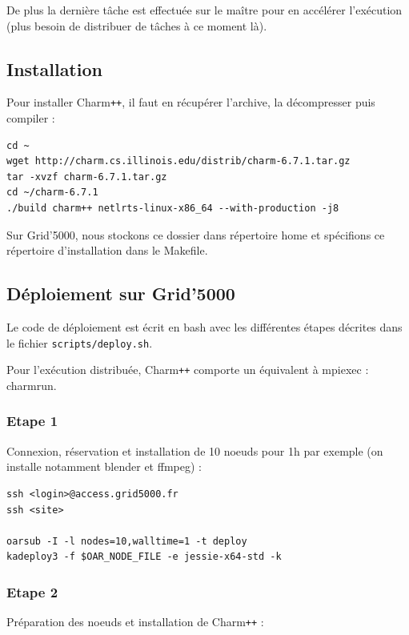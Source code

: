 \documentclass[a4paper, 11pt, titlepage]{article}
\begin{document}
De plus la dernière tâche est effectuée sur le maître pour en accélérer l'exécution (plus besoin de distribuer de tâches à ce moment là).


\subsection {Installation}

\noindent Pour installer Charm\texttt{++}, il faut en récupérer l'archive, la décompresser puis compiler :

\begin{verbatim}
cd ~
wget http://charm.cs.illinois.edu/distrib/charm-6.7.1.tar.gz
tar -xvzf charm-6.7.1.tar.gz
cd ~/charm-6.7.1
./build charm++ netlrts-linux-x86_64 --with-production -j8
\end{verbatim}

Sur Grid'5000, nous stockons ce dossier dans répertoire home et spécifions ce répertoire d'installation dans le Makefile.


\subsection {Déploiement sur Grid'5000}

Le code de déploiement est écrit en bash avec les différentes étapes décrites dans le fichier \texttt{scripts/deploy.sh}.

Pour l'exécution distribuée, Charm\texttt{++} comporte un équivalent à mpiexec : charmrun.


\subsubsection {Etape 1}

Connexion, réservation et installation de 10 noeuds pour 1h par exemple (on installe notamment blender et ffmpeg) :

\begin{verbatim}
ssh <login>@access.grid5000.fr
ssh <site>

oarsub -I -l nodes=10,walltime=1 -t deploy
kadeploy3 -f $OAR_NODE_FILE -e jessie-x64-std -k
\end{verbatim}

\subsubsection {Etape 2}

Préparation des noeuds et installation de Charm\texttt{++} :
\end{document}
